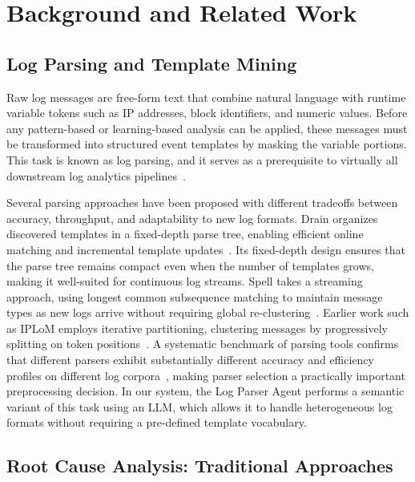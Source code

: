 
\chapter{Background and Related Work}

\section{Log Parsing and Template Mining}

Raw log messages are free-form text that combine natural language with runtime variable tokens
such as IP addresses, block identifiers, and numeric values. Before any pattern-based or
learning-based analysis can be applied, these messages must be transformed into structured event
templates by masking the variable portions. This task is known as log parsing, and it serves as a
prerequisite to virtually all downstream log analytics
pipelines~\cite{zhu2019tools}.

Several parsing approaches have been proposed with different tradeoffs between accuracy, throughput,
and adaptability to new log formats. Drain organizes discovered templates in a fixed-depth parse
tree, enabling efficient online matching and incremental template
updates~\cite{he2017drain}. Its fixed-depth design ensures that the parse tree remains compact
even when the number of templates grows, making it well-suited for continuous log streams. Spell
takes a streaming approach, using longest common subsequence matching to maintain message types as
new logs arrive without requiring global re-clustering~\cite{du2016spell}. Earlier work such as
IPLoM employs iterative partitioning, clustering messages by progressively splitting on token
positions~\cite{makanju2009iplom}. A systematic benchmark of parsing tools confirms that different
parsers exhibit substantially different accuracy and efficiency profiles on different log
corpora~\cite{zhu2019tools}, making parser selection a practically important preprocessing decision.
In our system, the Log Parser Agent performs a semantic variant of this task using an LLM, which
allows it to handle heterogeneous log formats without requiring a pre-defined template vocabulary.

\section{Root Cause Analysis: Traditional Approaches}

